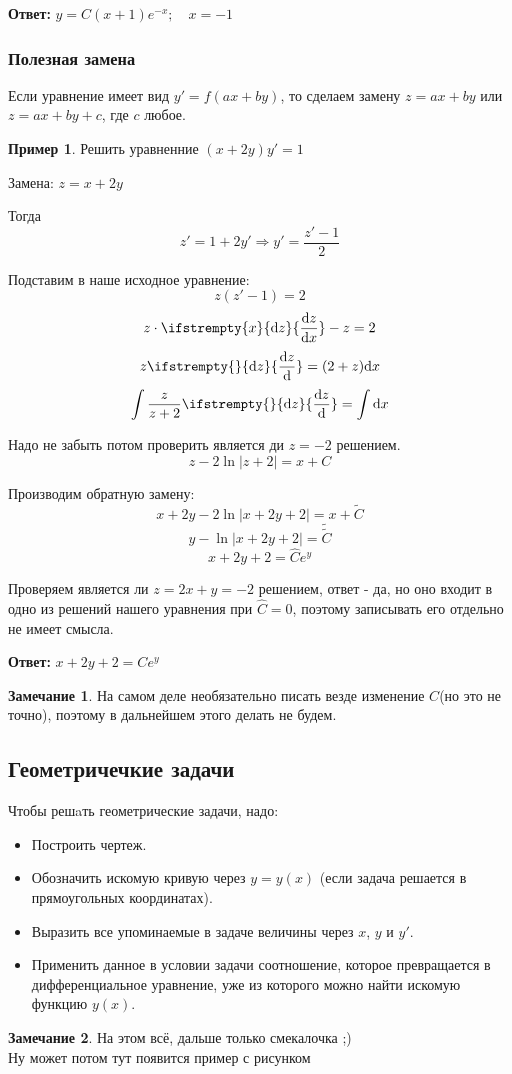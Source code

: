 \documentclass[a4paper, 14pt]{article}
\newcommand{\dx}{\mathrm{d}x}
\newcommand{\dv}[2]{%
  \ifstrempty{#2}%
    {\mathrm{d}#1}%
    {\frac{\mathrm{d}#1}{\mathrm{d}#2}}%
}
\theoremstyle{definition}
\newtheorem*{remark}{Замечание}
\newtheorem*{example}{Пример}
\newenvironment{answer}
  {\par\noindent\textbf{Ответ:}}
  {\par}
\begin{document}
\begin{answer}
$y = C(x+1)e^{-x}; \quad x=-1 $
\end{answer}

\subsubsection{Полезная замена}
Если уравнение имеет вид $y' = f(ax+by)$, то сделаем замену $z = ax+by$ или $z = ax+by+c$, где $c$ любое.
\begin{example}
    Решить уравненние $(x+2y)y'=1$
    
    Замена: $z = x+2y$
    
    Тогда \[z'=1+2y' \Longrightarrow y'=\frac{z'-1}{2}\]
    
    Подставим в наше исходное уравнение:
    \[z(z'-1)=2\]
    \[z \cdot \dv{z}{x} - z = 2\]
    \[z\dv{z}{} = (2+z)\dx\]
    \[\int{\frac{z}{z+2} \dv{z}{}} = \int{\dx}\]
    
    Надо не забыть потом проверить является ди $z = -2$ решением.
    \[z-2\ln{|z+2|} = x + C\]
    
    Производим обратную замену:
    \[x + 2y - 2\ln{|x+2y+2|} =x + \tilde{C}\]
    \[y - \ln{|x+2y+2|} =\tilde{\tilde{C}}\]
    \[x+2y+2 = \hat{C}e^y\]
    
    Проверяем является ли $z = 2x+y = -2$ решением, ответ - да, но оно входит в одно из решений нашего уравнения при $\hat{C} = 0$, поэтому записывать его отдельно не имеет смысла.
\end{example}
\begin{answer}
$x+2y+2 = Ce^y$
\end{answer}
\begin{remark}
    На самом деле необязательно писать везде изменение $C$(но это не точно), поэтому в дальнейшем этого делать не будем.
\end{remark}
\newpage
\subsection{Геометричечкие задачи}

Чтобы решaть геометрические задачи, надо:
\begin{itemize}
\item \textbf{}Построить чертеж.
\item \textbf{}Обозначить искомую кривую через $y = y(x)$ (если задача решается в прямоугольных координатах).
\item \textbf{}Выразить все упоминаемые в задаче величины через $x$, $y$ и $y'$.
\item \textbf{}Применить данное в условии задачи соотношение, которое превращается в дифференциальное уравнение, уже из которого можно найти искомую функцию $y(x)$.
\end{itemize}
\begin{remark}
    На этом всё, дальше только смекалочка ;)\\
    Ну может потом тут появится пример с рисунком  
\end{remark}
\end{document}

